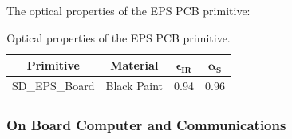\begin{table}[H]
  \centering
  \caption{Bulk properties of the EPS board primitive.}
\end{table}

The optical properties of the EPS PCB primitive:

\begin{table}[H]
  \centering
  \begin{tabular}{@{}cccc@{}}
  \toprule
  \textbf{Primitive} & \textbf{Material} & $\mathbf{\epsilon_{IR}}$ & $\mathbf{\alpha_{S}}$ \\ \midrule
  SD\_EPS\_Board & Black Paint       & 0.94                     & 0.96                  \\ \bottomrule
  \end{tabular}
  \caption{Optical properties of the EPS PCB primitive.}
\end{table}

\subsubsection{On Board Computer and Communications}

